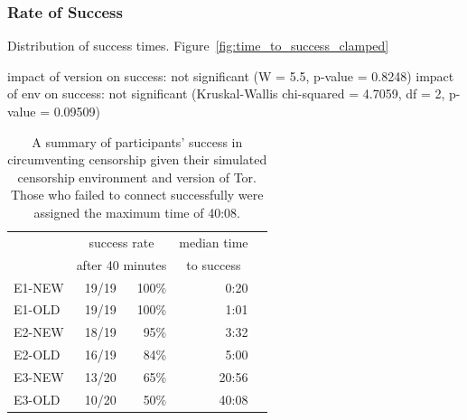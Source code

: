 \documentclass[USenglish,oneside,twocolumn]{article}
\begin{document}
\subsubsection{Rate of Success} 
Distribution of success times. Figure~\ref{fig:time_to_success_clamped}

impact of version on success: not significant (W = 5.5, p-value = 0.8248)
impact of env on success: not significant (Kruskal-Wallis chi-squared = 4.7059, df = 2, p-value = 0.09509)

\begin{table}
\centering
	\begin{tabular}{l r r r r}
	& \multicolumn{2}{c}{success rate} & \multicolumn{1}{c}{median time} \\
	& \multicolumn{2}{c}{after 40 minutes} & \multicolumn{1}{c}{to success} \\
	\noalign{\hrule}
	E1-NEW & 19/19 & 100\% & 0:20 \\ %
	E1-OLD & 19/19 & 100\% & 1:01 \\ %
	E2-NEW & 18/19 & 95\% & 3:32 \\ %
	E2-OLD & 16/19 & 84\% & 5:00 \\ %
	E3-NEW & 13/20 & 65\% & 20:56 \\ %
	E3-OLD & 10/20 & 50\% & 40:08 \\ %
	\end{tabular}
\caption{
A summary of participants' success in circumventing censorship
given their simulated censorship environment and version of Tor. Those who
failed to connect successfully were assigned the maximum time of 40:08.
}
\label{table:participant-summary}
\end{table}
\end{document}
